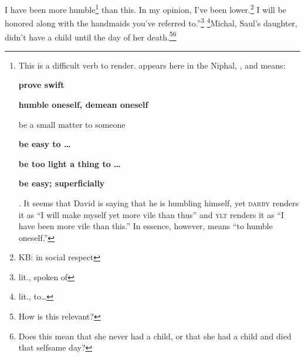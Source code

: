 \begin{inparaenum}
     I have been more humble\footnote{This is a difficult verb to render.  appears here in the Niphal, , and means: %
    \begin{inparaenum}
        \item \textbf{prove swift}
        \item \textbf{humble oneself, demean oneself}
        \item be a small matter to someone
        \item \textbf{be easy to \dots}
        \item \textbf{be too light a thing to \dots}
        \item \textbf{be easy; superficially}
    \end{inparaenum}%
    . It seems that David is saying that he is humbling himself, yet \textsc{darby} renders it as ``I will make myself yet more vile than thus'' and \textsc{ylt} renders it as ``I have been more vile than this.'' In essence, however,  means ``to humble oneself.''} than this. In my opinion, I've been lower.\footnote{KB: in social respect} I will be honored along with the handmaids you've referred to.''\footnote{lit., spoken of}%
     \footnote{lit., to\dots}Michal, Saul's daughter, didn't have a child until the day of her death.\footnote{How is this relevant?}\footnote{Does this mean that she never had a child, or that she had a child and died that selfsame day?}%
\end{inparaenum}
